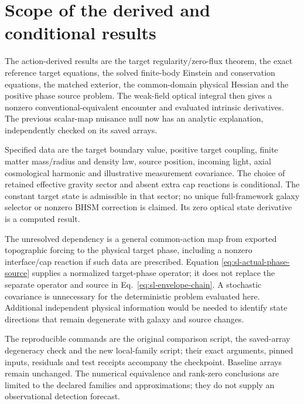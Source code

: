 

\section{Scope of the derived and conditional results}
\label{sec:sl-limitations}
The action-derived results are the target regularity/zero-flux theorem,
the exact reference target equations, the solved finite-body Einstein and
conservation equations, the matched exterior, the common-domain physical
Hessian and the positive phase source problem. The weak-field optical
integral then gives a nonzero conventional-equivalent encounter and
evaluated intrinsic derivatives. The previous scalar-map nuisance null
now has an analytic explanation, independently checked on its saved arrays.

Specified data are the target boundary value, positive target coupling,
finite matter mass/radius and density law, source position, incoming light,
axial cosmological harmonic and illustrative measurement covariance. The
choice of retained effective gravity sector and absent extra cap reactions
is conditional. The constant target state is admissible in that sector;
no unique full-framework galaxy selector or nonzero BHSM correction is
claimed. Its zero optical state derivative is a computed result.

The unresolved dependency is a general common-action map from exported
topographic forcing to the physical target phase, including a nonzero
interface/cap reaction if such data are prescribed. Equation
\eqref{eq:sl-actual-phase-source} supplies a normalized target-phase
operator; it does not replace the separate operator and source in
Eq.~\eqref{eq:sl-envelope-chain}. A stochastic covariance is unnecessary
for the deterministic problem evaluated here. Additional independent
physical information would be needed to identify state directions that
remain degenerate with galaxy and source changes.

The reproducible commands are the original comparison script, the
saved-array degeneracy check and the new local-family script; their exact
arguments, pinned inputs, residuals and test receipts accompany the
checkpoint. Baseline arrays remain unchanged. The numerical equivalence
and rank-zero conclusions are limited to the declared families and
approximations; they do not supply an observational detection forecast.

